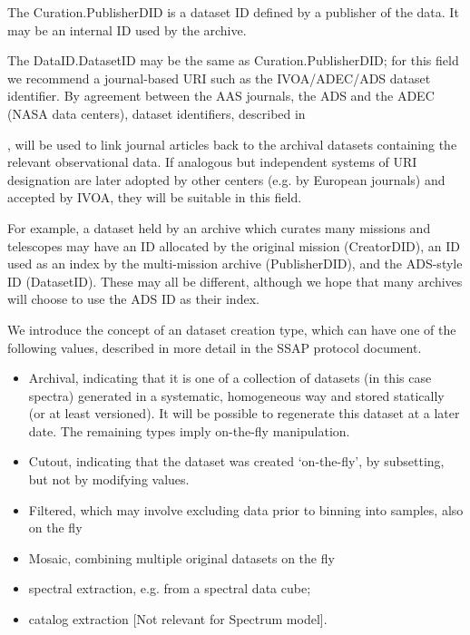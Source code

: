 \documentclass[11pt]{article}
\newcommand{\link}[1]{{\color{dblue}\htmladdnormallink{#1}\par}}
\begin{document}
The Curation.PublisherDID is a dataset ID defined by a publisher
of the data. It may be an internal ID used by the archive.

The DataID.DatasetID may be the same as Curation.PublisherDID;
for this field we recommend a journal-based URI such
as the IVOA/ADEC/ADS dataset identifier.
By agreement between the AAS journals, the ADS and the ADEC (NASA data centers),
dataset identifiers, described in 
\link{http://vo.ads.harvard.edu/dv/},
will be used to link journal articles back
to the archival datasets containing the relevant observational data.
If analogous but independent systems of URI designation are later
adopted by other centers (e.g. by European journals) and accepted by IVOA,
they will be suitable in this field.

For example, a dataset held by an archive which curates many
missions and telescopes may have an ID allocated by the original
mission (CreatorDID), an ID used as an index by the multi-mission archive (PublisherDID),
and the ADS-style ID (DatasetID). These may all be different, although
we hope that many archives will choose to use the ADS ID as their index.

We introduce the concept of an dataset creation type, which
can have one of the following  values, described in more
detail in the SSAP protocol document.

\begin{itemize}

\item Archival, indicating that it is one of a collection of
datasets (in this case spectra) generated in a systematic, homogeneous
way and stored statically (or at least versioned). It will be possible
to regenerate this dataset at a later date. The remaining types
imply on-the-fly manipulation.

\item Cutout, indicating that the dataset was created `on-the-fly',
by subsetting, but not by modifying values.

\item Filtered,  which may involve excluding data prior
to binning into samples, also on the fly

\item Mosaic, combining multiple original datasets on the fly

\item spectral extraction, e.g. from a spectral data cube;

\item catalog extraction [Not relevant for Spectrum model].

\end{itemize}
\end{document}
